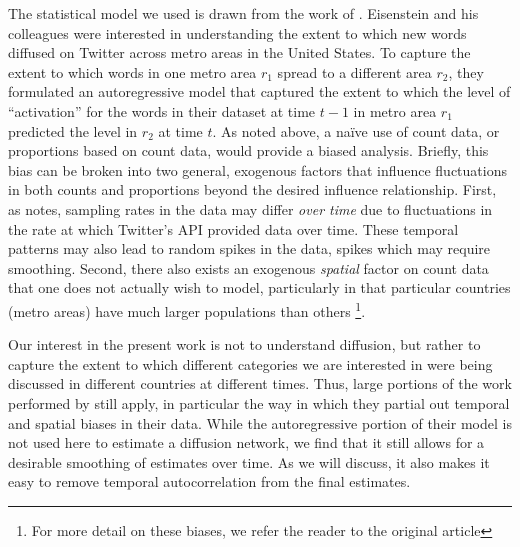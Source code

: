 The statistical model we used is drawn from the work of \cite{eisenstein_diffusion_2014}. Eisenstein and his colleagues were interested in understanding the extent to which new words diffused on Twitter across metro areas in the United States.  To capture the extent to which words in one metro area $r_1$ spread to a different area $r_2$, they formulated an autoregressive model that captured the extent to which the level of ``activation'' for the words in their dataset at time $t-1$ in metro area $r_1$ predicted the level in $r_2$ at time $t$.   As noted above, a na\"{i}ve use of count data, or proportions based on count data, would provide a biased analysis.  Briefly, this bias can be broken into two general, exogenous factors that influence fluctuations in both counts and proportions beyond the desired influence relationship.  First, as \cite{eisenstein_diffusion_2014} notes, sampling rates in the data may differ \emph{over time} due to fluctuations in the rate at which Twitter's API provided data over time.  These temporal patterns may also lead to random spikes in the data, spikes which may require smoothing.  Second,  there also exists an exogenous \emph{spatial} factor on count data that one does not actually wish to model, particularly in that particular countries (metro areas) have much larger populations than others   \footnote{For more detail on these biases, we refer the reader to the original article}.

Our interest in the present work is not to understand diffusion, but rather to capture the extent to which different categories we are interested in were being discussed in different countries at different times.  Thus, large portions of the work performed by \cite{eisenstein_diffusion_2014} still apply, in particular the way in which they partial out temporal and spatial biases in their data. While the autoregressive portion of their model is not used here to estimate a diffusion network, we find that it still allows for a desirable smoothing of estimates over time. As we will discuss, it also makes it easy to remove temporal autocorrelation from the final estimates. 

